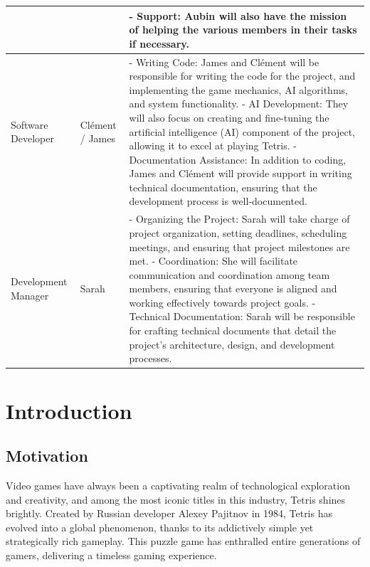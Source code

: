\documentclass[conference]{IEEEtran}
\begin{document}
\begin{center}
\begin{tabular}{ | m{1.7cm} | m{1.2cm}| m{5cm} | }    
    &
    &
    - Support: Aubin will also have the mission of helping the various members in their tasks if necessary.\\
    \hline
    Software Developer & 
    Clément / James & 
    - Writing Code: James and Clément will be responsible for writing the code for the project, and implementing the game mechanics, AI algorithms, and system functionality.
    \newline- AI Development: They will also focus on creating and fine-tuning the artificial intelligence (AI) component of the project, allowing it to excel at playing Tetris.
    \newline- Documentation Assistance: In addition to coding, James and Clément will provide support in writing technical documentation, ensuring that the development process is well-documented. \\
    \hline
    Development Manager & 
    Sarah & 
    - Organizing the Project: Sarah will take charge of project organization, setting deadlines, scheduling meetings, and ensuring that project milestones are met.
    \newline- Coordination: She will facilitate communication and coordination among team members, ensuring that everyone is aligned and working effectively towards project goals.
    \newline- Technical Documentation: Sarah will be responsible for crafting technical documents that detail the project's architecture, design, and development processes.\\
    \hline
\end{tabular}
\end{center}



\section{Introduction}
\subsection*{Motivation}
Video games have always been a captivating realm of technological exploration and creativity, and among the most iconic titles in this industry, Tetris shines brightly. Created by Russian developer Alexey Pajitnov in 1984, Tetris has evolved into a global phenomenon, thanks to its addictively simple yet strategically rich gameplay. This puzzle game has enthralled entire generations of gamers, delivering a timeless gaming experience.
\end{document}
